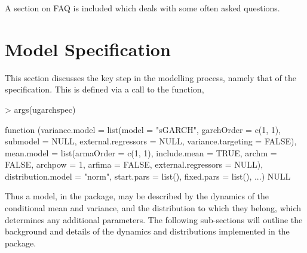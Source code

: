 A section on FAQ is included which deals with some often asked questions.

\section{Model Specification}
This section discusses the key step in the modelling process, namely that of the
specification. This is defined via a call to the \verb@ugarchspec@ function,
\begin{Schunk}
\begin{Sinput}
> args(ugarchspec)
\end{Sinput}
\begin{Soutput}
function (variance.model = list(model = "sGARCH", garchOrder = c(1,
    1), submodel = NULL, external.regressors = NULL, variance.targeting = FALSE),
    mean.model = list(armaOrder = c(1, 1), include.mean = TRUE,
        archm = FALSE, archpow = 1, arfima = FALSE, external.regressors = NULL),
    distribution.model = "norm", start.pars = list(), fixed.pars = list(),
    ...)
NULL
\end{Soutput}
\end{Schunk}
Thus a model, in the \verb@rugarch@ package, may be described by the dynamics of
the conditional mean and variance, and the distribution to which they belong,
which determines any additional parameters. The following sub-sections will
outline the background and details of the dynamics and distributions implemented
in the package.

